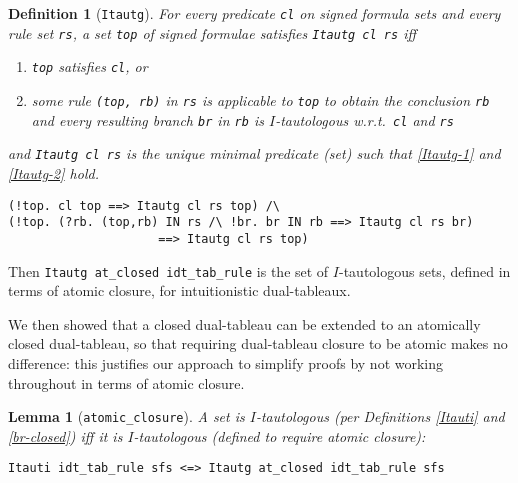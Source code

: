 \documentclass[a4paper]{article}
\newtheorem{lemma}{Lemma}
\newtheorem{definition}{Definition}
\begin{document}
\begin{definition}[\texttt{Itautg}]\label{Itautg} 
  For every predicate \texttt{cl} on signed formula sets and
  every rule set \texttt{rs}, a set \texttt{top} of signed
  formulae satisfies \texttt{Itautg cl rs} iff
  \begin{enumerate} 
  \item \label{Itautg-1}
    \texttt{top} satisfies \texttt{cl}, or
  \item \label{Itautg-2}
   some rule \texttt{(top, rb)} in \texttt{rs} 
   is applicable to \texttt{top} to obtain the conclusion \texttt{rb} 
   and every resulting branch \texttt{br} in \texttt{rb} is
  $I$-tautologous w.r.t.\ \texttt{cl} and \texttt{rs}
  \end{enumerate} 
  and \texttt{Itautg cl rs} is the unique minimal predicate (set) such that
  \ref{Itautg-1} and \ref{Itautg-2} hold.
\begin{verbatim} 
(!top. cl top ==> Itautg cl rs top) /\ 
(!top. (?rb. (top,rb) IN rs /\ !br. br IN rb ==> Itautg cl rs br)  
                     ==> Itautg cl rs top)
\end{verbatim}
\end{definition}

Then \texttt{Itautg at\_closed idt\_tab\_rule} is the set of
$I$-tautologous sets, defined in terms of atomic closure, for
intuitionistic dual-tableaux.

We then showed 
that a closed dual-tableau can be extended to an atomically closed
dual-tableau, so
that requiring dual-tableau closure to be atomic makes no difference:
this justifies our approach to simplify proofs by not working throughout
in terms of atomic closure.

\begin{lemma}[\texttt{atomic\_closure}]\label{atomic-closure}
A set is $I$-tautologous (per Definitions \ref{Itauti} and \ref{br-closed})
iff it is $I$-tautologous (defined to require atomic closure):
\end{lemma}
\begin{verbatim}
Itauti idt_tab_rule sfs <=> Itautg at_closed idt_tab_rule sfs 
\end{verbatim}
\end{document}
